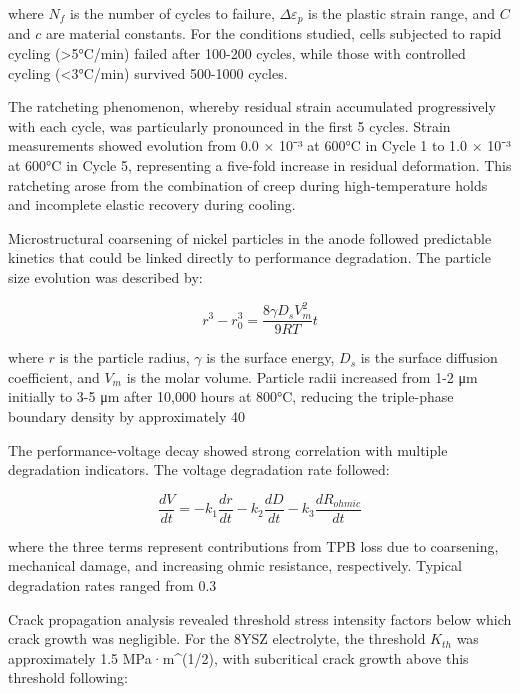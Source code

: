 \documentclass[conference]{IEEEtran}
\begin{document}
where $N_f$ is the number of cycles to failure, $\Delta\varepsilon_p$ is the plastic strain range, and $C$ and $c$ are material constants. For the conditions studied, cells subjected to rapid cycling (>5°C/min) failed after 100-200 cycles, while those with controlled cycling (<3°C/min) survived 500-1000 cycles.

The ratcheting phenomenon, whereby residual strain accumulated progressively with each cycle, was particularly pronounced in the first 5 cycles. Strain measurements showed evolution from 0.0 × 10⁻³ at 600°C in Cycle 1 to 1.0 × 10⁻³ at 600°C in Cycle 5, representing a five-fold increase in residual deformation. This ratcheting arose from the combination of creep during high-temperature holds and incomplete elastic recovery during cooling.

Microstructural coarsening of nickel particles in the anode followed predictable kinetics that could be linked directly to performance degradation. The particle size evolution was described by:

\begin{equation}
r^3 - r_0^3 = \frac{8\gamma D_s V_m^2}{9RT}t
\end{equation}

where $r$ is the particle radius, $\gamma$ is the surface energy, $D_s$ is the surface diffusion coefficient, and $V_m$ is the molar volume. Particle radii increased from 1-2 μm initially to 3-5 μm after 10,000 hours at 800°C, reducing the triple-phase boundary density by approximately 40%

The performance-voltage decay showed strong correlation with multiple degradation indicators. The voltage degradation rate followed:

\begin{equation}
\frac{dV}{dt} = -k_1 \frac{dr}{dt} - k_2 \frac{dD}{dt} - k_3 \frac{dR_{ohmic}}{dt}
\end{equation}

where the three terms represent contributions from TPB loss due to coarsening, mechanical damage, and increasing ohmic resistance, respectively. Typical degradation rates ranged from 0.3%

Crack propagation analysis revealed threshold stress intensity factors below which crack growth was negligible. For the 8YSZ electrolyte, the threshold $K_{th}$ was approximately 1.5 MPa·m^(1/2), with subcritical crack growth above this threshold following:
\end{document}
